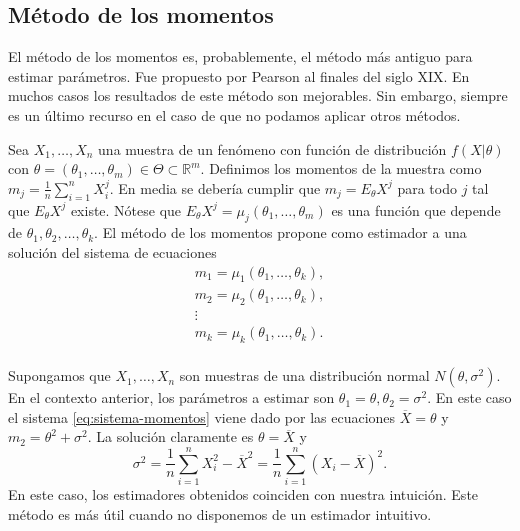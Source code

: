 \subsection{Método de los momentos}

El método de los momentos es, probablemente, el método más antiguo para estimar parámetros. Fue propuesto por Pearson al finales del siglo XIX. En muchos casos los resultados de este método son mejorables. Sin embargo, siempre es un último recurso en el caso de que no podamos aplicar otros métodos.

Sea $X_1, \ldots, X_n$ una muestra de un fenómeno con función de distribución $f(X |\theta)$ con $\theta = (\theta_1, \ldots, \theta_m) \in \Theta \subset \mathbb{R}^m$. Definimos los momentos de la muestra como $m_j = \frac{1}{n} \sum_{i = 1}^n X_i^j$. En media se debería cumplir que $m_j = E_\theta X^j$ para todo $j$ tal que $E_\theta X^j$ existe. Nótese que $E_\theta X^j = \mu_j(\theta_1, \ldots, \theta_m)$ es una función que depende de $\theta_1, \theta_2, \ldots, \theta_k$. El método de los momentos propone como estimador a una solución del sistema de ecuaciones
\begin{equation} \label{eq:sistema-momentos}
    \begin{matrix}
        m_1 = \mu_1(\theta_1, \ldots, \theta_k), \\
        m_2 = \mu_2(\theta_1, \ldots, \theta_k), \\
        \vdots \\
        m_k = \mu_k(\theta_1, \ldots, \theta_k). \\
    \end{matrix}
\end{equation}

\begin{ex}
    Supongamos que $X_1, \ldots, X_n$ son muestras de una distribución normal $N(\theta, \sigma^2)$. En el contexto anterior, los parámetros a estimar son $\theta_1 = \theta, \theta_2 = \sigma^2$. En este caso el sistema \eqref{eq:sistema-momentos} viene dado por las ecuaciones $\overline{X} = \theta$ y $m_2 = \theta^2 + \sigma^2$. La solución claramente es $\theta = \overline{X}$ y
    \[\sigma^2 = \frac{1}{n} \sum_{i = 1}^n X_i^2 - \overline{X}^2 = \frac{1}{n} \sum_{i = 1}^n (X_i - \overline{X})^2.\]
    En este caso, los estimadores obtenidos coinciden con nuestra intuición. Este método es más útil cuando no disponemos de un estimador intuitivo.
\end{ex}

